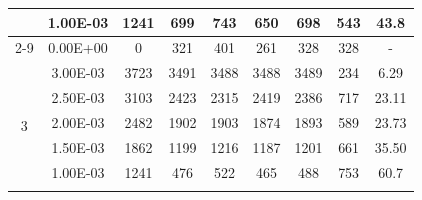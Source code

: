 \begin{table}[H]
{\begin{tabular}{|c|c|c|c|c|c|c|c|c|}
                               & 1.00E-03         & 1241      & 699                                                        & 743                                                       & 650                                                       & 698     & 543    & 43.8                                                               \\ \cline{2-9}
                               & 0.00E+00         & 0         & 321                                                        & 401                                                       & 261                                                       & 328     & 328    & -                                                                  \\ \hline
            \multirow{6}{*}{3} & 3.00E-03         & 3723      & 3491                                                       & 3488                                                      & 3488                                                      & 3489    & 234    & 6.29                                                               \\ \cline{2-9}
                               & 2.50E-03         & 3103      & 2423                                                       & 2315                                                      & 2419                                                      & 2386    & 717    & 23.11                                                              \\ \cline{2-9}
                               & 2.00E-03         & 2482      & 1902                                                       & 1903                                                      & 1874                                                      & 1893    & 589    & 23.73                                                              \\ \cline{2-9}
                               & 1.50E-03         & 1862      & 1199                                                       & 1216                                                      & 1187                                                      & 1201    & 661    & 35.50                                                              \\ \cline{2-9}
                               & 1.00E-03         & 1241      & 476                                                        & 522                                                       & 465                                                       & 488     & 753    & 60.7                                                               \\ \cline{2-9}

\end{tabular}}
\end{table}
